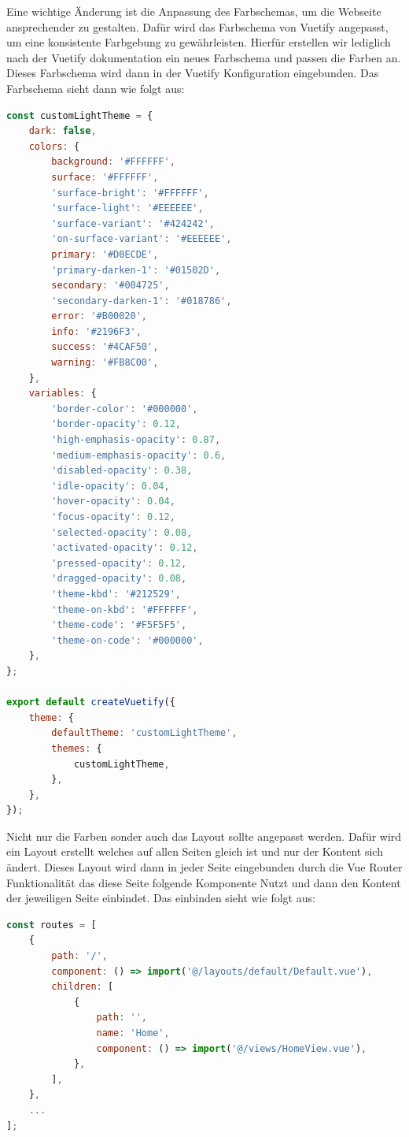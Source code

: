 Eine wichtige Änderung ist die Anpassung des Farbschemas, um die Webseite ansprechender zu gestalten. Dafür wird das Farbschema von Vuetify angepasst, um eine konsistente Farbgebung zu gewährleisten. Hierfür erstellen wir lediglich nach der Vuetify dokumentation ein neues Farbschema und passen die Farben an. Dieses Farbschema wird dann in der Vuetify Konfiguration eingebunden. Das Farbschema sieht dann wie folgt aus: \cite{vuetiy-custom-color-theme}

\begin{lstlisting}[language={JavaScript}, caption={Vuetify Farbschema anpassung}]
const customLightTheme = {
    dark: false,
    colors: {
        background: '#FFFFFF',
        surface: '#FFFFFF',
        'surface-bright': '#FFFFFF',
        'surface-light': '#EEEEEE',
        'surface-variant': '#424242',
        'on-surface-variant': '#EEEEEE',
        primary: '#D0ECDE',
        'primary-darken-1': '#01502D',
        secondary: '#004725',
        'secondary-darken-1': '#018786',
        error: '#B00020',
        info: '#2196F3',
        success: '#4CAF50',
        warning: '#FB8C00',
    },
    variables: {
        'border-color': '#000000',
        'border-opacity': 0.12,
        'high-emphasis-opacity': 0.87,
        'medium-emphasis-opacity': 0.6,
        'disabled-opacity': 0.38,
        'idle-opacity': 0.04,
        'hover-opacity': 0.04,
        'focus-opacity': 0.12,
        'selected-opacity': 0.08,
        'activated-opacity': 0.12,
        'pressed-opacity': 0.12,
        'dragged-opacity': 0.08,
        'theme-kbd': '#212529',
        'theme-on-kbd': '#FFFFFF',
        'theme-code': '#F5F5F5',
        'theme-on-code': '#000000',
    },
};

export default createVuetify({
    theme: {
        defaultTheme: 'customLightTheme',
        themes: {
            customLightTheme,
        },
    },
});
\end{lstlisting}

Nicht nur die Farben sonder auch das Layout sollte angepasst werden. Dafür wird ein Layout erstellt welches auf allen Seiten gleich ist und nur der Kontent sich ändert. Dieses Layout wird dann in jeder Seite eingebunden durch die Vue Router Funktionalität das diese Seite folgende Komponente Nutzt und dann den Kontent der jeweiligen Seite einbindet. Das einbinden sieht wie folgt aus:

\begin{lstlisting}[language={JavaScript}, caption={Einbindung des Layouts in der Vue Router Konfiguration}]
const routes = [
    {
        path: '/',
        component: () => import('@/layouts/default/Default.vue'),
        children: [
            {
                path: '',
                name: 'Home',
                component: () => import('@/views/HomeView.vue'),
            },
        ],
    },
    ...
];
\end{lstlisting}

